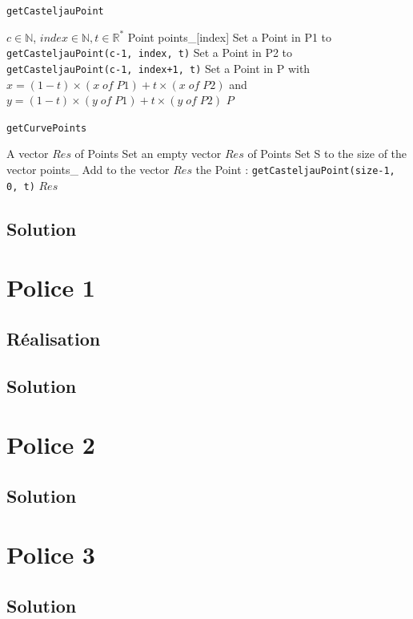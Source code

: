 \documentclass[a4paper, 12pt]{article}
\begin{document}
\begin{algorithm}
	\caption{\texttt{getCasteljauPoint}}
		\begin{algorithmic}[1]
		\Require $c \in \mathbb{N}$, $index \in \mathbb{N}, t \in \mathbb{R}^{*}$
		\Ensure Point
			\State \Return points\_[index] 
		\EndIf
		\State Set a Point in P1 to \texttt{getCasteljauPoint(c-1, index, t)} 
		\State Set a Point in P2 to \texttt{getCasteljauPoint(c-1, index+1, t)} 
		\State Set a Point in P with $x = (1-t) \times (x \; of \; P1) + t \times (x \; of \; P2)$ and $y = (1-t) \times (y \; of \; P1) + t \times (y \; of \; P2)$
		\State \Return $P$
		\EndFunction
		\end{algorithmic}
\end{algorithm}

\begin{algorithm}
	\caption{\texttt{getCurvePoints}}
		\begin{algorithmic}[2]
		\Require 
		\Ensure A vector $Res$ of Points
		\State Set an empty vector $Res$ of Points
		\State Set S to the size of the vector points\_
			\State Add to the vector $Res$ the Point : \texttt{getCasteljauPoint(size-1, 0, t)} 
		\EndFor
		\State \Return $Res$
		\EndFunction
		\end{algorithmic}
\end{algorithm}
	
	
\subsection{Solution}

\section{Police 1}	
\subsection{Réalisation}
\subsection{Solution}

\section{Police 2}	
\subsection{Solution}

\section{Police 3}			
\subsection{Solution}
	
\end{document}
